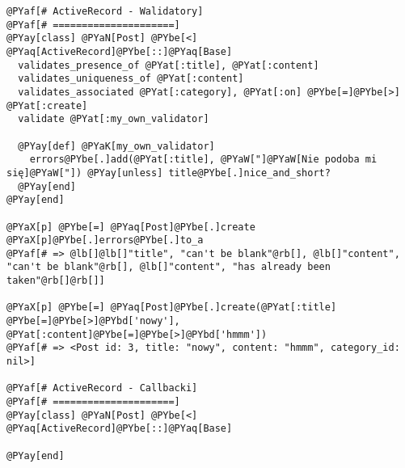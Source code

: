 \begin{Verbatim}[commandchars=@\[\]]
@PYaf[# ActiveRecord - Walidatory]
@PYaf[# =====================]
@PYay[class] @PYaN[Post] @PYbe[<] @PYaq[ActiveRecord]@PYbe[::]@PYaq[Base]
  validates_presence_of @PYat[:title], @PYat[:content]
  validates_uniqueness_of @PYat[:content]
  validates_associated @PYat[:category], @PYat[:on] @PYbe[=]@PYbe[>] @PYat[:create]
  validate @PYat[:my_own_validator]

  @PYay[def] @PYaK[my_own_validator]
    errors@PYbe[.]add(@PYat[:title], @PYaW["]@PYaW[Nie podoba mi się]@PYaW["]) @PYay[unless] title@PYbe[.]nice_and_short?
  @PYay[end]
@PYay[end]

@PYaX[p] @PYbe[=] @PYaq[Post]@PYbe[.]create
@PYaX[p]@PYbe[.]errors@PYbe[.]to_a
@PYaf[# => @lb[]@lb[]"title", "can't be blank"@rb[], @lb[]"content", "can't be blank"@rb[], @lb[]"content", "has already been taken"@rb[]@rb[]]

@PYaX[p] @PYbe[=] @PYaq[Post]@PYbe[.]create(@PYat[:title] @PYbe[=]@PYbe[>]@PYbd['nowy'], @PYat[:content]@PYbe[=]@PYbe[>]@PYbd['hmmm'])
@PYaf[# => <Post id: 3, title: "nowy", content: "hmmm", category_id: nil>]

@PYaf[# ActiveRecord - Callbacki]
@PYaf[# =====================]
@PYay[class] @PYaN[Post] @PYbe[<] @PYaq[ActiveRecord]@PYbe[::]@PYaq[Base]

@PYay[end]
\end{Verbatim}
